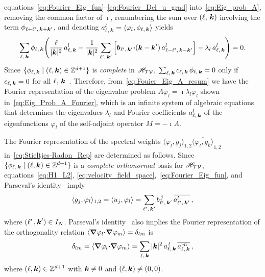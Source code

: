 \documentclass[amsa]{ipart}
\begin{document}
equations~\eqref{eq:Fourier_Eig_fun}--\eqref{eq:Fourier_Del_u_grad} 
into~\eqref{eq:Eig_prob_A}, removing the common factor of
$\imath$, renumbering the sum over $(\ell,\,\boldsymbol{k})$  involving the term
$\phi_{\ell+\ell^\prime,\,\boldsymbol{k}+\boldsymbol{k}^\prime}$, and denoting
$a^l_{\ell,\,\boldsymbol{k}}=\langle\varphi_l,\phi_{\ell,\,\boldsymbol{k}}\rangle$ yields 
%
\begin{align}\label{eq:Fouier_Eig_A_resum}
  \sum_{\ell,\,\veck}\phi_{\ell,\,\veck}
  \Bigg(
  \frac{\ell}{|\veck|^2}\,a^l_{\ell,\,\veck}
  -
   \frac{1}{|\veck|^2} \sum_{\ell^\prime,\,\veck^\prime}  
  \Big[
  \vecb_{\ell^\prime,\,\veck^\prime}\bcdot(\veck-\veck^\prime)\,
  a^l_{\ell-\ell^\prime,\,\veck-\veck^\prime}
  \Big]  
  -\lambda_l\,a^l_{\ell,\,\veck}
  \Bigg)=0.
\end{align}
%
Since $\{\phi_{\ell,\,\boldsymbol{k}} \;|\; (\ell,\boldsymbol{k})\in\mathbb{Z}^{d+1}\}$ is 
\emph{complete} in $\mathscr{H}_{\mathcal{T}\mathcal{V}}$,
$\sum_{\ell,\,\boldsymbol{k}}c_{\ell,\,\boldsymbol{k}}\,\phi_{\ell,\,\boldsymbol{k}}=0$ only if
$c_{\ell,\,\boldsymbol{k}}=0$ for all
$\ell,\,\boldsymbol{k}$~\cite{Folland:99:RealAnalysis}. Therefore,
from~\eqref{eq:Fouier_Eig_A_resum} we have the Fourier representation 
of the eigenvalue problem $A\varphi_l=\imath\lambda_l\varphi_l$ shown
in~\eqref{eq:Eig_Prob_A_Fourier}, which is an infinite system of
algebraic equations that determines the eigenvalues $\lambda_l$ and Fourier 
coefficients $a^l_{\ell,\,\boldsymbol{k}}$ of the eigenfunctions $\varphi_l$ of the
self-adjoint operator $M=-\imath A$. 



The Fourier representation of the spectral weights
$\langle\varphi_l,g_j\rangle_{1,2}\overline{\langle\varphi_l,g_k\rangle}_{1,2}$
in~\eqref{eq:Stieltjes-Radon_Rep} are determined as follows.
Since $\{\phi_{\ell,\,\boldsymbol{k}}\;|\; (\ell,\boldsymbol{k})\in\mathbb{Z}^{d+1}\}$ is a
\emph{complete orthonormal} basis for $\mathscr{H}_{\mathcal{T}\mathcal{V}}$, 
equations~\eqref{eq:H1_L2},
\eqref{eq:velocity_field_space},~\eqref{eq:Fourier_Eig_fun}, and
Parseval's identity~\cite{PapaRudin:87} imply  
%
\begin{align}\label{eq:Inner_Products}
  \langle g_j,\varphi_l\rangle_{1,2}=\langle u_j,\varphi_l\rangle=\sum_{\ell^\prime,\,\veck^\prime}
   b^{\,j}_{\ell^\prime,\,\veck^\prime}\,\overline{a^l_{\ell^\prime,\,\veck^\prime}}\,,
\end{align}
%
where $(\ell^\prime\,,\boldsymbol{k}^\prime)\in I_N$.
Parseval's identity~\cite{PapaRudin:87} also implies the Fourier
representation of the orthogonality relation 
$\langle\mbox{\boldmath${\nabla}$}\varphi_l\mbox{\boldmath${\cdot}$}\mbox{\boldmath${\nabla}$} \varphi_m\rangle=\delta_{lm}$ is 
%
\begin{align}\label{eq:Ortho_Clmn}
  \delta_{lm}=\langle\bnabla \varphi_l\bcdot\bnabla \varphi_m\rangle
      = \sum_{\ell,\,\veck}|\veck|^2\,a^{\,l}_{\ell,\,\veck}\,\overline{a^{\,m}_{\ell,\,\veck}}\,,
\end{align}
%
where $(\ell,\boldsymbol{k})\in\mathbb{Z}^{d+1}$ with $\boldsymbol{k}\neq0$ and
$(\ell,\boldsymbol{k})\neq(0,0)$.
\end{document}
